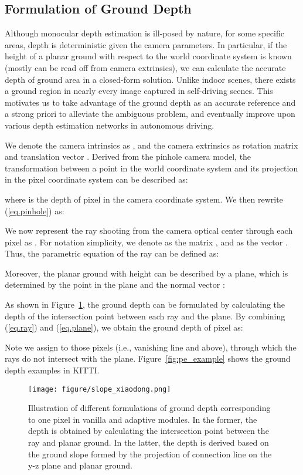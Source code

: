 \documentclass[10pt,twocolumn,letterpaper]{article}
\begin{document}
\subsection{Formulation of Ground Depth}
\label{sec:formulate}
Although monocular depth estimation is ill-posed by nature, for some specific areas, depth is deterministic given the camera parameters. In particular, if the height of a planar ground with respect to the world coordinate system is known (mostly can be read off from camera extrinsics), we can calculate the accurate depth of ground area in a closed-form solution. Unlike indoor scenes, there exists a ground region in nearly every image captured in self-driving scenes. This motivates us to take advantage of the ground depth as an accurate reference and a strong priori to alleviate the ambiguous problem, and eventually improve upon various depth estimation networks in autonomous driving.            

We denote the camera intrinsics as , and the camera extrinsics as rotation matrix  and translation vector . Derived from the pinhole camera model, the transformation between a point  in the world coordinate system and its projection  in the pixel coordinate system can be described as:

where  is the depth of pixel  in the camera coordinate system. We then rewrite (\ref{eq.pinhole}) as: 

We now represent the ray shooting from the camera optical center through each pixel as . For notation simplicity, we denote  as the matrix , and  as the vector . Thus, the parametric equation of the ray can be defined as: 

Moreover, the planar ground with height  can be described by a plane, which is determined by the point  in the plane and the normal vector :

As shown in Figure~\ref{fig:pe_module}, the ground depth can be formulated by calculating the depth of the intersection point between each ray and the plane. By combining (\ref{eq.ray}) and (\ref{eq.plane}), we obtain the ground depth of pixel  as:

Note we assign  to those pixels (i.e., vanishing line and above), through which the rays do not intersect with the plane. Figure~\ref{fig:pe_example} shows the ground depth examples in KITTI. 

\begin{figure}[t]
\begin{center}
\texttt{[image: figure/slope\_xiaodong.png]}
\end{center}
   \caption{Illustration of different formulations of ground depth corresponding to one pixel in vanilla and adaptive modules. In the former, the depth  is obtained by calculating the intersection point  between the ray and planar ground. In the latter, the depth  is derived based on the ground slope  formed by the projection of connection line  on the y-z plane and planar ground. 
   }
\label{fig:pe_module}
\end{figure}
\end{document}
